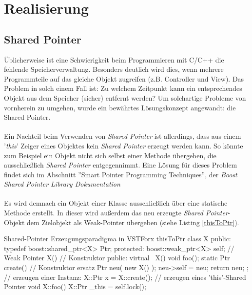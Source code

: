 \section{Realisierung}
\subsection{Shared Pointer}
Üblicherweise ist eine Schwierigkeit beim Programmieren mit C/C++ die fehlende Speicherverwaltung. Besonders deutlich wird dies, wenn mehrere Programmteile auf das gleiche Objekt zugreifen (z.B. Controller und View). Das Problem in solch einem Fall ist: Zu welchem Zeitpunkt kann ein entsprechendes Objekt aus dem Speicher (sicher) entfernt werden?
Um solchartige Probleme von vornherein zu umgehen, wurde ein bewährtes Lösungskonzept angewandt: die Shared Pointer.
\\\\
Ein Nachteil beim Verwenden von \emph{Shared Pointer} ist allerdings, dass aus einem '\emph{this}' Zeiger eines Objektes kein \emph{Shared Pointer} erzeugt werden kann. So könnte zum Beispiel ein Objekt nicht sich selbst einer Methode übergeben, die ausschließlich \emph{Shared Pointer} entgegennimmt.
Eine Lösung für dieses Problem findet sich im Abschnitt ''Smart Pointer Programming Techniques'', der \emph{Boost Shared Pointer Library Dokumentation}
\\\\
Es wird demnach ein Objekt einer Klasse ausschließlich über eine statische Methode erstellt. In dieser wird außerdem das neu erzeugte \emph{Shared Pointer}-Objekt dem Zielobjekt als Weak-Pointer übergeben (siehe Listing \ref{thisToPtr}).
\begin{code}{Shared-Pointer Erzeugungsparadigma in VSTForx }{thisToPtr}
class X {
public:
	typedef boost::shared_ptr<X> Ptr;
protected:
	boost::weak_ptr<X> self; // Weak Pointer
	X() {} // Konstruktor
public:
	virtual ~X() {} 
	void foo();
	static Ptr create() { // Konstruktor ersatz
		Ptr neu( new X() );
		neu->self = neu; 
		return neu;
	}
};
// erzeugen einer Instanz:
X::Ptr x = X::create();
// erzeugen eines 'this'-Shared Pointer
void X::foo() {
	X::Ptr _this = self.lock();
}
\end{code} 
